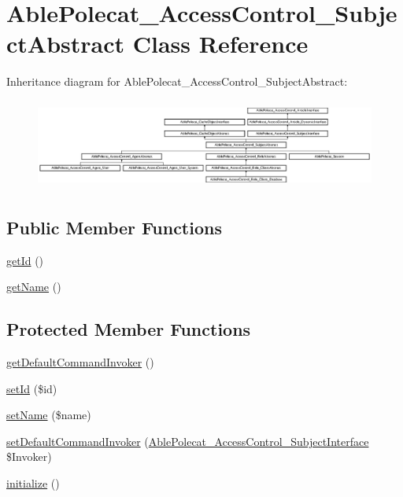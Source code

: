\hypertarget{class_able_polecat___access_control___subject_abstract}{}\section{Able\+Polecat\+\_\+\+Access\+Control\+\_\+\+Subject\+Abstract Class Reference}
\label{class_able_polecat___access_control___subject_abstract}
Inheritance diagram for Able\+Polecat\+\_\+\+Access\+Control\+\_\+\+Subject\+Abstract\+:\begin{figure}[H]
\begin{center}
\leavevmode
\includegraphics[height=2.987805cm]{class_able_polecat___access_control___subject_abstract}
\end{center}
\end{figure}
\subsection*{Public Member Functions}
\begin{DoxyCompactItemize}
\item 
\hyperlink{class_able_polecat___access_control___subject_abstract_a12251d0c022e9e21c137a105ff683f13}{get\+Id} ()
\item 
\hyperlink{class_able_polecat___access_control___subject_abstract_a3d0963e68bb313b163a73f2803c64600}{get\+Name} ()
\end{DoxyCompactItemize}
\subsection*{Protected Member Functions}
\begin{DoxyCompactItemize}
\item 
\hyperlink{class_able_polecat___access_control___subject_abstract_a60be366090fa500d8062c7dfc40bfaf6}{get\+Default\+Command\+Invoker} ()
\item 
\hyperlink{class_able_polecat___access_control___subject_abstract_a87313ad678fb2a2a8efb435cf0bdb9a0}{set\+Id} (\$id)
\item 
\hyperlink{class_able_polecat___access_control___subject_abstract_a2fe666694997d047711d7653eca2f132}{set\+Name} (\$name)
\item 
\hyperlink{class_able_polecat___access_control___subject_abstract_a8af7037413ce56303d66df3b83c9f6d3}{set\+Default\+Command\+Invoker} (\hyperlink{interface_able_polecat___access_control___subject_interface}{Able\+Polecat\+\_\+\+Access\+Control\+\_\+\+Subject\+Interface} \$Invoker)
\item 
\hyperlink{class_able_polecat___access_control___subject_abstract_a91098fa7d1917ce4833f284bbef12627}{initialize} ()
\end{DoxyCompactItemize}
